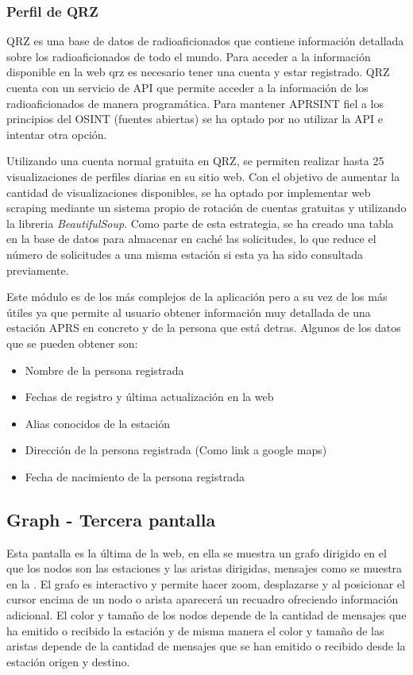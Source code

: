 \subsubsection{Perfil de QRZ}
QRZ es una base de datos de radioaficionados que contiene información detallada sobre los radioaficionados de todo el mundo. Para acceder a la información disponible en la web qrz es necesario tener una cuenta y estar registrado. QRZ cuenta con un servicio de API que permite acceder a la información de los radioaficionados de manera programática. Para mantener APRSINT fiel a los principios del OSINT (fuentes abiertas) se ha optado por no utilizar la API e intentar otra opción.

Utilizando una cuenta normal gratuita en QRZ, se permiten realizar hasta 25 visualizaciones de perfiles diarias en su sitio web. Con el objetivo de aumentar la cantidad de visualizaciones disponibles, se ha optado por implementar web scraping mediante un sistema propio de rotación de cuentas gratuitas y utilizando la libreria \textit{BeautifulSoup}. Como parte de esta estrategia, se ha creado una tabla en la base de datos para almacenar en caché las solicitudes, lo que reduce el número de solicitudes a una misma estación si esta ya ha sido consultada previamente.

Este módulo es de los más complejos de la aplicación pero a su vez de los más útiles ya que permite al usuario obtener información muy detallada de una estación APRS en concreto y de la persona que está detras. Algunos de los datos que se pueden obtener son: 

\begin{itemize}
	\item Nombre de la persona registrada
	\item Fechas de registro y última actualización en la web
	\item Alias conocidos de la estación
	\item Dirección de la persona registrada (Como link a google maps)
	\item Fecha de nacimiento de la persona registrada
\end{itemize}



\subsection{Graph - Tercera pantalla}
Esta pantalla es la última de la web, en ella se muestra un grafo dirigido en el que los nodos son las estaciones y las aristas dirigidas, mensajes como se muestra en la . El grafo es interactivo y permite hacer zoom, desplazarse y al posicionar el cursor encima de un nodo o arista aparecerá un recuadro ofreciendo información adicional. El color y tamaño de los nodos depende de la cantidad de mensajes que ha emitido o recibido la estación y de misma manera el color y tamaño de las aristas depende de la cantidad de mensajes que se han emitido o recibido desde la estación origen y destino.

